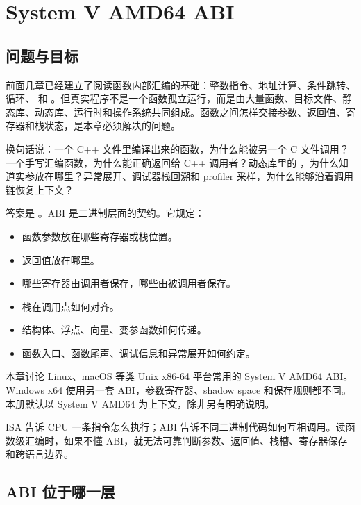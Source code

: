 \chapter{System V AMD64 ABI}

\section{问题与目标}

前面几章已经建立了阅读函数内部汇编的基础：整数指令、地址计算、条件跳转、循环、 和 。但真实程序不是一个函数孤立运行，而是由大量函数、目标文件、静态库、动态库、运行时和操作系统共同组成。函数之间怎样交接参数、返回值、寄存器和栈状态，是本章必须解决的问题。

换句话说：一个 C++ 文件里编译出来的函数，为什么能被另一个 C 文件调用？一个手写汇编函数，为什么能正确返回给 C++ 调用者？动态库里的 ，为什么知道实参放在哪里？异常展开、调试器栈回溯和 profiler 采样，为什么能够沿着调用链恢复上下文？

答案是 。ABI 是二进制层面的契约。它规定：

\begin{itemize}
  \item 函数参数放在哪些寄存器或栈位置。
  \item 返回值放在哪里。
  \item 哪些寄存器由调用者保存，哪些由被调用者保存。
  \item 栈在调用点如何对齐。
  \item 结构体、浮点、向量、变参函数如何传递。
  \item 函数入口、函数尾声、调试信息和异常展开如何约定。
\end{itemize}

本章讨论 Linux、macOS 等类 Unix x86-64 平台常用的 System V AMD64 ABI。Windows x64 使用另一套 ABI，参数寄存器、shadow space 和保存规则都不同。本册默认以 System V AMD64 为上下文，除非另有明确说明。

\begin{keyidea}
ISA 告诉 CPU 一条指令怎么执行；ABI 告诉不同二进制代码如何互相调用。读函数级汇编时，如果不懂 ABI，就无法可靠判断参数、返回值、栈槽、寄存器保存和跨语言边界。
\end{keyidea}

\section{ABI 位于哪一层}

